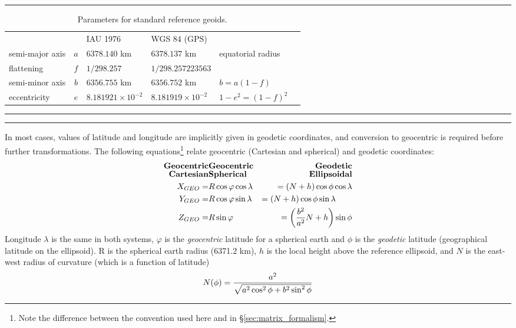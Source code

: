 \documentclass[11pt,twoside]{article}   %
\begin{document}
 \begin{table}[hbt!]
 \hrule
 \begin{tabular}{lclllr}
   {} & {}  & IAU 1976 & WGS 84 (GPS) & \\
   semi-major axis & $a$  & $6378.140$ km & $6378.137$ km & equatorial radius\\
   flattening & $f$  & $1/298.257$ & $1/298.257223563$ \\
   semi-minor axis & $b$  & $6356.755$ km & $6356.752$ km &$b=a(1-f)$\\
   eccentricity & $e$  & $8.181921 \times 10^{-2}$ & $8.181919 \times 10^{-2}$ &$1-e^2 = (1-f)^2$\\
 \end{tabular}
 \hrule
  \caption{Parameters for standard reference geoids.
  \label{tab:referencegeoids}}
  \hrule
\end{table}

In most cases, values of latitude and longitude are implicitly
given in geodetic coordinates, and conversion to geocentric is
required before further transformations. The following
equations\footnote{Note the difference between the convention used
here and in \S \ref{sec:matrix_formalism}.} relate geocentric
(Cartesian and spherical) and geodetic coordinates:
%
 \begin{eqnarray}
 \mathbf{Geocentric} & \mathbf{Geocentric} & \quad\mathbf{Geodetic} \nonumber \\[-5pt]
 \mathbf{Cartesian} & \mathbf{Spherical} & \quad\mathbf{Ellipsoidal} \nonumber \\
  X_{GEO} =& R \cos\varphi \cos\lambda &= (N+h) \cos\phi \cos\lambda   \nonumber\\
  Y_{GEO} =& R \cos\varphi \sin\lambda &= (N+h) \cos\phi \sin\lambda  \qquad \\
  Z_{GEO} =& R \sin\varphi &=  \left( {b^2 \over a^2} N +h \right) \sin\phi   \nonumber
 \label{eqn:coordinates}
 \end{eqnarray}
%
Longitude $\lambda$ is the same in both systems, $\varphi$ is the
\emph{geocentric} latitude for a spherical earth and $\phi$ is the
\emph{geodetic} latitude (geographical latitude on the ellipsoid).
R is the spherical earth radius (6371.2 km), $h$ is the local
height above the reference ellipsoid, and $N$ is the east-west
radius of curvature (which is a function of latitude)
%
 \begin{equation}
  N(\phi) = {{a^2}\over \sqrt{a^2 \cos^2\phi + b^2 \sin^2 \phi}}
 \end{equation}
\end{document}
